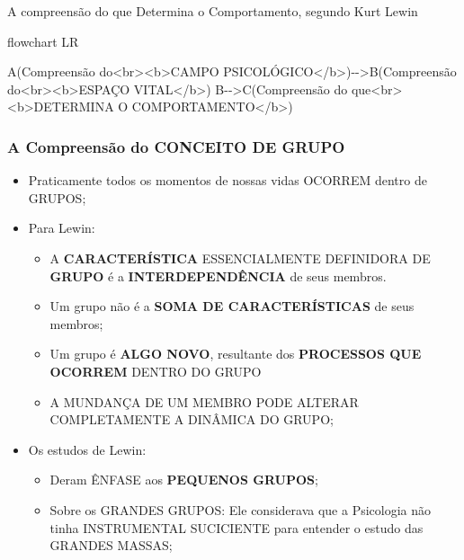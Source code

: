 \documentclass[
]{book}
\newenvironment{Shaded}{\begin{snugshade}}{\end{snugshade}}
\newcommand{\NormalTok}[1]{#1}
\providecommand{\tightlist}{%
  \setlength{\itemsep}{0pt}\setlength{\parskip}{0pt}}
\begin{document}
A compreensão do que Determina o Comportamento, segundo Kurt Lewin

\begin{Shaded}
\begin{Highlighting}[]
\NormalTok{flowchart LR}

\NormalTok{A(Compreensão do\textless{}br\textgreater{}\textless{}b\textgreater{}CAMPO PSICOLÓGICO\textless{}/b\textgreater{}){-}{-}\textgreater{}B(Compreensão do\textless{}br\textgreater{}\textless{}b\textgreater{}ESPAÇO VITAL\textless{}/b\textgreater{})}
\NormalTok{B{-}{-}\textgreater{}C(Compreensão do que\textless{}br\textgreater{}\textless{}b\textgreater{}DETERMINA O COMPORTAMENTO\textless{}/b\textgreater{})}
\end{Highlighting}
\end{Shaded}

\hypertarget{a-compreensuxe3o-do-conceito-de-grupo}{%
\subsubsection{A Compreensão do CONCEITO DE
GRUPO}\label{a-compreensuxe3o-do-conceito-de-grupo}}

\begin{itemize}
\tightlist
\item
  Praticamente todos os momentos de nossas vidas OCORREM dentro de
  GRUPOS;
\item
  Para Lewin:

  \begin{itemize}
  \tightlist
  \item
    A \textbf{CARACTERÍSTICA} ESSENCIALMENTE DEFINIDORA DE \textbf{GRUPO
    } é a \textbf{INTERDEPENDÊNCIA} de seus membros.
  \item
    Um grupo não é a \textbf{SOMA DE CARACTERÍSTICAS} de seus membros;
  \item
    Um grupo é \textbf{ALGO NOVO}, resultante dos \textbf{PROCESSOS QUE
    OCORREM} DENTRO DO GRUPO
  \item
    A MUNDANÇA DE UM MEMBRO PODE ALTERAR COMPLETAMENTE A DINÂMICA DO
    GRUPO;
  \end{itemize}
\item
  Os estudos de Lewin:

  \begin{itemize}
  \tightlist
  \item
    Deram ÊNFASE aos \textbf{PEQUENOS GRUPOS};
  \item
    Sobre os GRANDES GRUPOS: Ele considerava que a Psicologia não tinha
    INSTRUMENTAL SUCICIENTE para entender o estudo das GRANDES MASSAS;
  \end{itemize}
\end{itemize}
\end{document}
